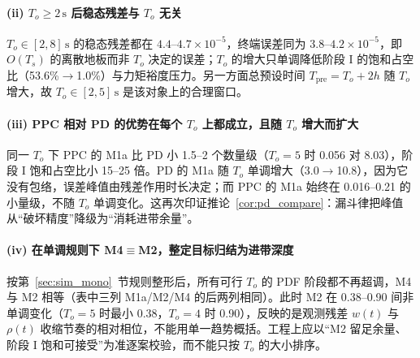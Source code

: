 \paragraph{(ii) \(T_o\ge2\,\mathrm s\) 后稳态残差与 \(T_o\) 无关}
\(T_o\in[2,8]\,\mathrm s\) 的稳态残差都在 \(4.4\)--\(4.7\times10^{-5}\)，终端误差同为 \(3.8\)--\(4.2\times10^{-5}\)，即 \(O(T_s)\) 的离散地板而非 \(T_o\) 决定的误差；\(T_o\) 的增大只单调降低阶段 I 的饱和占空比（53.6\%\(\to\)1.0\%）与力矩裕度压力。另一方面总预设时间 \(T_{\mathrm{pre}}=T_o+2h\) 随 \(T_o\) 增大，故 \(T_o\in[2,5]\,\mathrm s\) 是该对象上的合理窗口。

\paragraph{(iii) PPC 相对 PD 的优势在每个 \(T_o\) 上都成立，且随 \(T_o\) 增大而扩大}
同一 \(T_o\) 下 PPC 的 M1a 比 PD 小 1.5--2 个数量级（\(T_o=5\) 时 0.056 对 8.03），阶段 I 饱和占空比小 15--25 倍。PD 的 M1a 随 \(T_o\) 单调增大（3.0\(\to\)10.8），因为它没有包络，误差峰值由残差作用时长决定；而 PPC 的 M1a 始终在 0.016--0.21 的小量级，不随 \(T_o\) 单调变化。这再次印证推论~\ref{cor:pd_compare}：漏斗律把峰值从“破坏精度”降级为“消耗进带余量”。

\paragraph{(iv) 在单调规则下 M4\(\equiv\)M2，整定目标归结为进带深度}
按第~\ref{sec:sim_mono}~节规则整形后，所有可行 \(T_o\) 的 PDF 阶段都不再超调，M4 与 M2 相等（表中三列 M1a/M2/M4 的后两列相同）。此时 M2 在 0.38--0.90 间非单调变化（\(T_o=5\) 时最小 0.38，\(T_o=4\) 时 0.90），反映的是观测残差 \(w(t)\) 与 \(\rho(t)\) 收缩节奏的相对相位，不能用单一趋势概括。工程上应以“M2 留足余量、阶段 I 饱和可接受”为准逐案校验，而不能只按 \(T_o\) 的大小排序。
